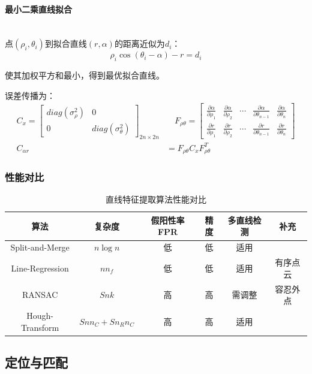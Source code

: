 \documentclass[
12pt, %
a4paper, 
oneside, %
]{scrartcl}
\begin{document}
\paragraph{最小二乘直线拟合}~\\

点$ (\rho_i, \theta_i) $到拟合直线$ (r, \alpha) $的距离近似为$ d_i $：
$$ \rho_i \cos(\theta_i - \alpha) - r = d_i $$

使其加权平方和最小，得到最优拟合直线。

误差传播为：
\begin{align*}
C_x = \begin{bmatrix} diag(\sigma_\rho^2) & 0 \\ 0 & diag(\sigma_\theta^2) \end{bmatrix}_{2n \times 2n} &\quad
F_{\rho \theta} = \begin{bmatrix} \frac{\partial \alpha}{\partial \rho_1} & \frac{\partial \alpha}{\partial \rho_2} & \cdots & \frac{\partial \alpha}{\partial \theta_{n - 1}} & \frac{\partial \alpha}{\partial \theta_n} \\ \frac{\partial r}{\partial \rho_1} & \frac{\partial r}{\partial \rho_2} & \cdots & \frac{\partial r}{\partial \theta_{n - 1}} & \frac{\partial r}{\partial \theta_n} \end{bmatrix} \\
C_{\alpha r} &= F_{\rho \theta} C_x F_{\rho \theta}^T    
\end{align*}
\subsubsection[性能对比]{性能对比}
\begin{table}[H]
\centering
\begin{tabular}{c|ccccc}
\hline
算法 & 复杂度 & 假阳性率FPR & 精度 & 多直线检测 & 补充 \\
\hline
Split-and-Merge & $ n \log n $ & 低 & 低 & 适用 &  \\
Line-Regression & $ n n_f $ & 低 & 低 & 适用 & 有序点云 \\
RANSAC & $ S n k $ & 高 & 高 & 需调整 & 容忍外点 \\
Hough-Transform & $ S n n_C + S n_R n_C $ & 高 & 高 & 适用 &  \\
\hline
\end{tabular}
\caption{直线特征提取算法性能对比}
\end{table}
\subsection[定位与匹配]{定位与匹配}
\end{document}
